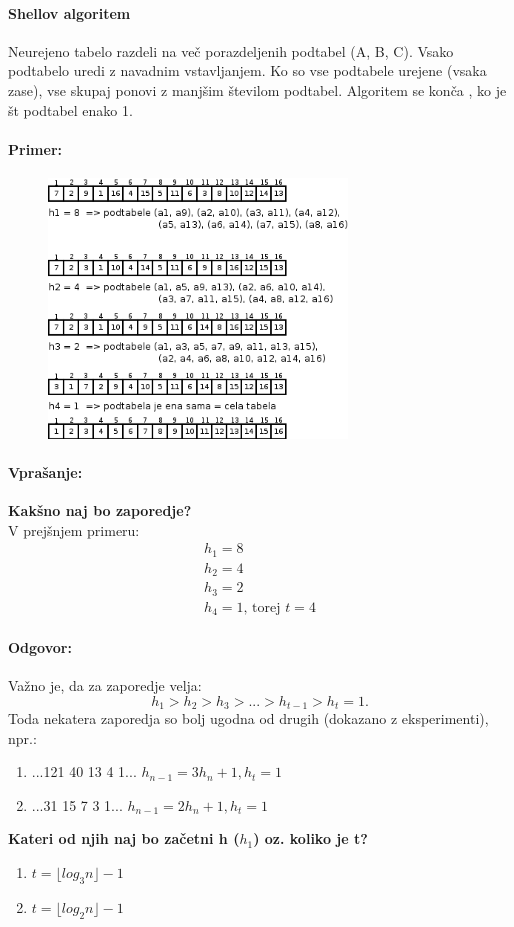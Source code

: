 \documentclass[a4paper,10pt]{article}
\begin{document}
\paragraph{Shellov algoritem}
Neurejeno tabelo razdeli na ve\v c porazdeljenih podtabel (A, B, C). Vsako podtabelo uredi z navadnim vstavljanjem. Ko so vse podtabele urejene (vsaka zase), vse skupaj ponovi z manj\v sim \v stevilom podtabel. Algoritem se kon\v ca , ko je \v st podtabel enako 1.

\paragraph{Primer:}
\begin{figure}[hbt]
	\centering
	\includegraphics[width=7.95cm,height=6.9cm]{Slike/ShellovoUrejanjePrimer.png}
	\label{Primer urejanja s Shellovo metodo}
\end{figure}

\paragraph{Vpra\v sanje:}
\textbf{Kak\v sno naj bo zaporedje?}\\
V prej\v snjem primeru:
$$
\begin{array}{l}
h_1 = 8 \\
h_2 = 4 \\
h_3 = 2 \\
h_4 = 1 \mbox{, torej } t = 4
\end{array}
$$

\paragraph{Odgovor:} Va\v zno je, da za zaporedje velja: 
$$h_1 > h_2 > h_3 > ... > h_{t-1} > h_t = 1.$$
Toda nekatera zaporedja so bolj ugodna od drugih (dokazano z eksperimenti), npr.:
\begin{enumerate}
\item ...121 40 13 4 1... $h_{n-1} = 3h_n + 1, h_t = 1$
\item ...31 15 7 3 1... $h_{n-1} = 2h_n + 1, h_t = 1$
\end{enumerate}
\textbf{Kateri od njih naj bo za\v cetni h ($h_1$) oz. koliko je t?}
\begin{enumerate}
\item $t = \lfloor log_3 n \rfloor - 1$
\item $t = \lfloor log_2 n \rfloor - 1$
\end{enumerate}
\end{document}
